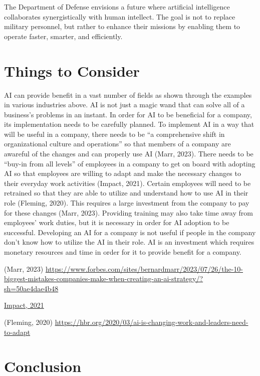 \documentclass[
]{article}
\begin{document}
The Department of Defense envisions a future where artificial intelligence collaborates synergistically with human intellect. The goal is not to replace military personnel, but rather to enhance their missions by enabling them to operate faster, smarter, and efficiently.

\hypertarget{things-to-consider}{%
\section{Things to Consider}\label{things-to-consider}}

AI can provide benefit in a vast number of fields as shown through the examples in various industries above. AI is not just a magic wand that can solve all of a business's problems in an instant. In order for AI to be beneficial for a company, its implementation needs to be carefully planned. To implement AI in a way that will be useful in a company, there needs to be ``a comprehensive shift in organizational culture and operations'' so that members of a company are awareful of the changes and can properly use AI (Marr, 2023). There needs to be ``buy-in from all levels'' of employees in a company to get on board with adopting AI so that employees are willing to adapt and make the necessary changes to their everyday work activities (Impact, 2021). Certain employees will need to be retrained so that they are able to utilize and understand how to use AI in their role (Fleming, 2020). This requires a large investment from the company to pay for these changes (Marr, 2023). Providing training may also take time away from employees' work duties, but it is necessary in order for AI adoption to be successful. Developing an AI for a company is not useful if people in the company don't know how to utilize the AI in their role. AI is an investment which requires monetary resources and time in order for it to provide benefit for a company.

(Marr, 2023) \url{https://www.forbes.com/sites/bernardmarr/2023/07/26/the-10-biggest-mistakes-companies-make-when-creating-an-ai-strategy/?sh=50ae4dae4b48}

\href{https://www.impactmybiz.com/blog/barriers-to-technology-adoption-in-business/}{Impact, 2021}

(Fleming, 2020)
\url{https://hbr.org/2020/03/ai-is-changing-work-and-leaders-need-to-adapt}

\hypertarget{conclusion-1}{%
\section{Conclusion}\label{conclusion-1}}
\end{document}
